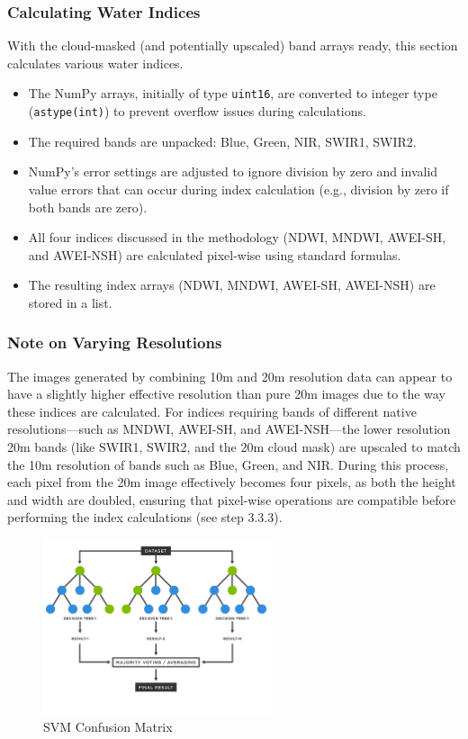 \subsubsection{Calculating Water Indices}
With the cloud-masked (and potentially upscaled) band arrays ready, this section calculates various water indices.
\begin{itemize}
    \item The NumPy arrays, initially of type \verb|uint16|, are converted to integer type (\verb|astype(int)|) to prevent overflow issues during calculations.
    \item The required bands are unpacked: Blue, Green, NIR, SWIR1, SWIR2.
    \item NumPy's error settings are adjusted to ignore division by zero and invalid value errors that can occur during index calculation (e.g., division by zero if both bands are zero).
    \item All four indices discussed in the methodology (NDWI, MNDWI, AWEI-SH, and AWEI-NSH) are calculated pixel-wise using standard formulas. 
    \item The resulting index arrays (NDWI, MNDWI, AWEI-SH, AWEI-NSH) are stored in a list.
\end{itemize}

\subsubsection{Note on Varying Resolutions}
The images generated by combining 10m and 20m resolution data can appear to have a slightly higher effective resolution than pure 20m images due to the way these indices are calculated. For indices requiring bands of different native resolutions—such as MNDWI, AWEI-SH, and AWEI-NSH—the lower resolution 20m bands (like SWIR1, SWIR2, and the 20m cloud mask) are upscaled to match the 10m resolution of bands such as Blue, Green, and NIR. During this process, each pixel from the 20m image effectively becomes four pixels, as both the height and width are doubled, ensuring that pixel-wise operations are compatible before performing the index calculations (see step 3.3.3).

\begin{figure}[ht]
    \centering
    \includegraphics[width=0.6\textwidth]{contents/figures/LR RF diagram.jpg}
    \caption{SVM Confusion Matrix \citep{maity_2016}}
    \label{fig:NOTHING}
\end{figure}

